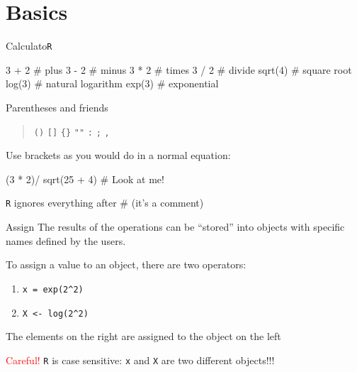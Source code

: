 \documentclass[
  ignorenonframetext,
]{beamer}
\newenvironment{Shaded}{\begin{snugshade}}{\end{snugshade}}
\newcommand{\CommentTok}[1]{\textcolor[rgb]{0.54,0.53,0.53}{#1}}
\newcommand{\DecValTok}[1]{\textcolor[rgb]{0.69,0.50,0.00}{#1}}
\newcommand{\FunctionTok}[1]{\textcolor[rgb]{0.39,0.29,0.61}{#1}}
\newcommand{\NormalTok}[1]{\textcolor[rgb]{0.12,0.11,0.11}{#1}}
\newcommand{\SpecialCharTok}[1]{\textcolor[rgb]{0.24,0.68,0.91}{#1}}
\begin{document}
\hypertarget{basics}{%
\section{Basics}\label{basics}}

\begin{frame}[fragile]{Calculato\texttt{R}}
\protect\hypertarget{calculator}{}
\begin{Shaded}
\begin{Highlighting}[]
\DecValTok{3} \SpecialCharTok{+} \DecValTok{2}   \CommentTok{\# plus}
\DecValTok{3} \SpecialCharTok{{-}} \DecValTok{2}   \CommentTok{\# minus}
\DecValTok{3} \SpecialCharTok{*} \DecValTok{2}   \CommentTok{\# times}
\DecValTok{3} \SpecialCharTok{/} \DecValTok{2}   \CommentTok{\# divide}
\FunctionTok{sqrt}\NormalTok{(}\DecValTok{4}\NormalTok{) }\CommentTok{\# square root}
\FunctionTok{log}\NormalTok{(}\DecValTok{3}\NormalTok{)  }\CommentTok{\# natural logarithm}
\FunctionTok{exp}\NormalTok{(}\DecValTok{3}\NormalTok{)  }\CommentTok{\# exponential}
\end{Highlighting}
\end{Shaded}

\footnotesize

Parentheses and friends

\begin{quote}
\texttt{()} \texttt{{[}{]}} \texttt{\{\}} \texttt{""} \texttt{:}
\texttt{;} \texttt{,}
\end{quote}

Use brackets as you would do in a normal equation:

\begin{Shaded}
\begin{Highlighting}[]
\NormalTok{(}\DecValTok{3} \SpecialCharTok{*} \DecValTok{2}\NormalTok{)}\SpecialCharTok{/} \FunctionTok{sqrt}\NormalTok{(}\DecValTok{25} \SpecialCharTok{+} \DecValTok{4}\NormalTok{) }\CommentTok{\# Look at me!}
\end{Highlighting}
\end{Shaded}

\texttt{R} ignores everything after \# (it's a comment)
\end{frame}

\begin{frame}[fragile]{Assign}
\protect\hypertarget{assign}{}
The results of the operations can be ``stored'' into objects with
specific names defined by the users.

To assign a value to an object, there are two operators:

\begin{enumerate}
\item
  \texttt{x\ =\ exp(2\^{}2)}
\item
  \texttt{X\ \textless{}-\ log(2\^{}2)}
\end{enumerate}

The elements on the right are assigned to the object on the left

\textcolor{red}{Careful!} \texttt{R} is case sensitive: \texttt{x} and
\texttt{X} are two different objects!!!
\end{frame}
\end{document}
